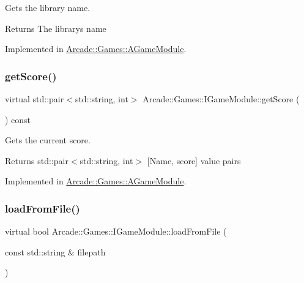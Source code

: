 Gets the library name. 

\begin{DoxyReturn}{Returns}
The library\textquotesingle{}s name 
\end{DoxyReturn}


Implemented in \mbox{\hyperlink{classArcade_1_1Games_1_1AGameModule_a3245a3ba2eac74eadf5041bc3806ed6b}{Arcade\+::\+Games\+::\+A\+Game\+Module}}.

\mbox{\label{classArcade_1_1Games_1_1IGameModule_ad84a0b04bb998a4eb3682c76d0fababf}} 
\subsubsection{\texorpdfstring{getScore()}{getScore()}}
{\footnotesize\ttfamily virtual std\+::pair$<$std\+::string, int$>$ Arcade\+::\+Games\+::\+I\+Game\+Module\+::get\+Score (\begin{DoxyParamCaption}{ }\end{DoxyParamCaption}) const\hspace{0.3cm}{\ttfamily [pure virtual]}}



Gets the current score. 

\begin{DoxyReturn}{Returns}
std\+::pair$<$std\+::string, int$>$ \mbox{[}Name, score\mbox{]} value pairs 
\end{DoxyReturn}


Implemented in \mbox{\hyperlink{classArcade_1_1Games_1_1AGameModule_a83dbf1572ae5e25174bc7b81fed7ba77}{Arcade\+::\+Games\+::\+A\+Game\+Module}}.

\mbox{\label{classArcade_1_1Games_1_1IGameModule_a2a8cdd7c90677b6ebd0f97d99254d256}} 
\subsubsection{\texorpdfstring{loadFromFile()}{loadFromFile()}\hspace{0.1cm}{\footnotesize\ttfamily [1/2]}}
{\footnotesize\ttfamily virtual bool Arcade\+::\+Games\+::\+I\+Game\+Module\+::load\+From\+File (\begin{DoxyParamCaption}\item[{const std\+::string \&}]{filepath }\end{DoxyParamCaption})\hspace{0.3cm}{\ttfamily [pure virtual]}}



